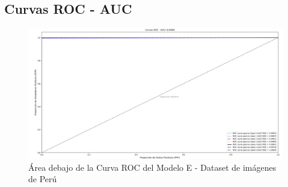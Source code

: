 		\subsection{Curvas ROC - AUC}  
					\begin{figure}[H]
						\includegraphics[width=1\textwidth, height=\textheight,keepaspectratio]{images/desarrollo/testResults/peru/ROC_curve_modelE} 
						\begin{center}
						\caption{\small{Área debajo de la Curva ROC del Modelo E - Dataset de imágenes de Perú}}
						\vspace{-1em}
						{\small{\fontsize{10}{16.8}\selectfont {Fuente propia}}}
						\end{center}
						\vspace{-1.5em}
					\end{figure}
